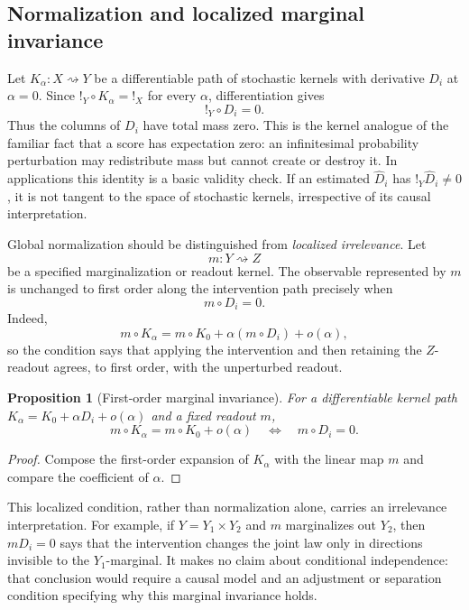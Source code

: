 \documentclass{article}
\theoremstyle{plain}
\newtheorem{proposition}[theorem]{Proposition}
\theoremstyle{definition}
\theoremstyle{remark}
\begin{document}
\subsection{Normalization and localized marginal invariance}

Let \(K_\alpha:X\rightsquigarrow Y\) be a differentiable path of stochastic
kernels with derivative \(D_i\) at \(\alpha=0\).  Since
\(!_{Y}\circ K_\alpha=!_{X}\) for every \(\alpha\), differentiation gives
\[
  !_{Y}\circ D_i=0.
\]
Thus the columns of \(D_i\) have total mass zero.  This is the kernel analogue
of the familiar fact that a score has expectation zero: an infinitesimal
probability perturbation may redistribute mass but cannot create or destroy
it.  In applications this identity is a basic validity check.  If an estimated
\(\widehat D_i\) has \(!_{Y}\widehat D_i\neq0\), it is not tangent to the
space of stochastic kernels, irrespective of its causal interpretation.

Global normalization should be distinguished from \emph{localized
irrelevance}.  Let
\[
  m:Y\rightsquigarrow Z
\]
be a specified marginalization or readout kernel.  The observable represented
by \(m\) is unchanged to first order along the intervention path precisely when
\[
  m\circ D_i=0.
\]
Indeed,
\[
  m\circ K_\alpha
  =
  m\circ K_0+\alpha(m\circ D_i)+o(\alpha),
\]
so the condition says that applying the intervention and then retaining the
\(Z\)-readout agrees, to first order, with the unperturbed readout.

\begin{proposition}[First-order marginal invariance]
\label{prop:marginal-invariance}
For a differentiable kernel path
\(K_\alpha=K_0+\alpha D_i+o(\alpha)\) and a fixed readout \(m\),
\[
  m\circ K_\alpha=m\circ K_0+o(\alpha)
  \quad\Longleftrightarrow\quad
  m\circ D_i=0.
\]
\end{proposition}

\begin{proof}
Compose the first-order expansion of \(K_\alpha\) with the linear map \(m\)
and compare the coefficient of \(\alpha\).
\end{proof}

This localized condition, rather than normalization alone, carries an
irrelevance interpretation.  For example, if \(Y=Y_1\times Y_2\) and \(m\)
marginalizes out \(Y_2\), then \(mD_i=0\) says that the intervention changes
the joint law only in directions invisible to the \(Y_1\)-marginal.  It makes
no claim about conditional independence: that conclusion would require a
causal model and an adjustment or separation condition specifying why this
marginal invariance holds.
\end{document}
